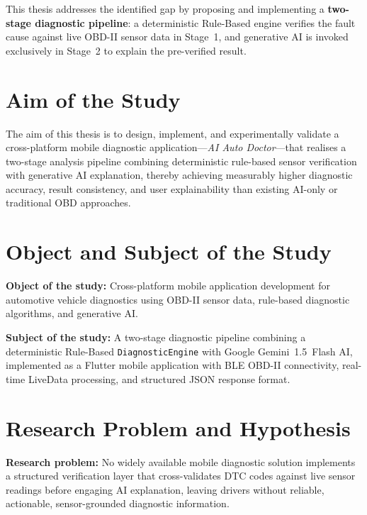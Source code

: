 This thesis addresses the identified gap by proposing and implementing a \textbf{two-stage diagnostic pipeline}: a deterministic Rule-Based engine verifies the fault cause against live OBD-II sensor data in Stage~1, and generative AI is invoked exclusively in Stage~2 to explain the pre-verified result.

\section*{Aim of the Study}

The aim of this thesis is to design, implement, and experimentally validate a cross-platform mobile diagnostic application---\textit{AI Auto Doctor}---that realises a two-stage analysis pipeline combining deterministic rule-based sensor verification with generative AI explanation, thereby achieving measurably higher diagnostic accuracy, result consistency, and user explainability than existing AI-only or traditional OBD approaches.

\section*{Object and Subject of the Study}

\textbf{Object of the study:} Cross-platform mobile application development for automotive vehicle diagnostics using OBD-II sensor data, rule-based diagnostic algorithms, and generative AI.

\textbf{Subject of the study:} A two-stage diagnostic pipeline combining a deterministic Rule-Based \texttt{DiagnosticEngine} with Google Gemini~1.5~Flash AI, implemented as a Flutter mobile application with BLE OBD-II connectivity, real-time LiveData processing, and structured JSON response format.

\section*{Research Problem and Hypothesis}

\textbf{Research problem:} No widely available mobile diagnostic solution implements a structured verification layer that cross-validates DTC codes against live sensor readings before engaging AI explanation, leaving drivers without reliable, actionable, sensor-grounded diagnostic information.

